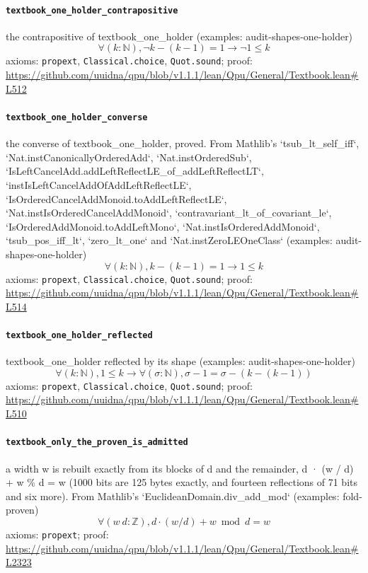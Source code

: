 \documentclass[11pt]{article}
\begin{document}
\paragraph{\texttt{textbook\_one\_holder\_contrapositive}}
the contrapositive of textbook\_one\_holder (examples: audit-shapes-one-holder)
\[ \forall (k : \mathbb{N}), \neg k - (k - 1) = 1 \to \neg 1 \le k \]
\noindent axioms: \texttt{propext}, \texttt{Classical.choice}, \texttt{Quot.sound}; proof: \url{https://github.com/uuidna/qpu/blob/v1.1.1/lean/Qpu/General/Textbook.lean\#L512}

\paragraph{\texttt{textbook\_one\_holder\_converse}}
the converse of textbook\_one\_holder, proved. From Mathlib's `tsub\_lt\_self\_iff`, `Nat.instCanonicallyOrderedAdd`, `Nat.instOrderedSub`, `IsLeftCancelAdd.addLeftReflectLE\_of\_addLeftReflectLT`, `instIsLeftCancelAddOfAddLeftReflectLE`, `IsOrderedCancelAddMonoid.toAddLeftReflectLE`, `Nat.instIsOrderedCancelAddMonoid`, `contravariant\_lt\_of\_covariant\_le`, `IsOrderedAddMonoid.toAddLeftMono`, `Nat.instIsOrderedAddMonoid`, `tsub\_pos\_iff\_lt`, `zero\_lt\_one` and `Nat.instZeroLEOneClass` (examples: audit-shapes-one-holder)
\[ \forall (k : \mathbb{N}), k - (k - 1) = 1 \to 1 \le k \]
\noindent axioms: \texttt{propext}, \texttt{Classical.choice}, \texttt{Quot.sound}; proof: \url{https://github.com/uuidna/qpu/blob/v1.1.1/lean/Qpu/General/Textbook.lean\#L514}

\paragraph{\texttt{textbook\_one\_holder\_reflected}}
textbook\_one\_holder reflected by its shape (examples: audit-shapes-one-holder)
\[ \forall (k : \mathbb{N}), 1 \le k \to \forall (\sigma : \mathbb{N}), \sigma - 1 = \sigma - (k - (k - 1)) \]
\noindent axioms: \texttt{propext}, \texttt{Classical.choice}, \texttt{Quot.sound}; proof: \url{https://github.com/uuidna/qpu/blob/v1.1.1/lean/Qpu/General/Textbook.lean\#L510}

\paragraph{\texttt{textbook\_only\_the\_proven\_is\_admitted}}
a width w is rebuilt exactly from its blocks of d and the remainder, d · (w / d) + w \% d = w (1000 bits are 125 bytes exactly, and fourteen reflections of 71 bits and six more). From Mathlib's `EuclideanDomain.div\_add\_mod` (examples: fold-proven)
\[ \forall (w\ d : \mathbb{Z}), d \cdot (w / d) + w \bmod d = w \]
\noindent axioms: \texttt{propext}; proof: \url{https://github.com/uuidna/qpu/blob/v1.1.1/lean/Qpu/General/Textbook.lean\#L2323}
\end{document}
